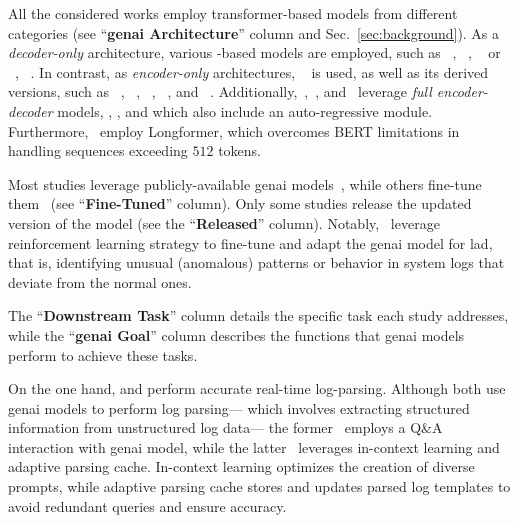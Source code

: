 All the considered works employ transformer-based models from different categories (see ``\textbf{\gls{genai} Architecture}'' column and \cf  Sec.~\ref{sec:background}).
As a \emph{decoder-only} architecture, various -based models are employed, such as 
~\cite{setianto2021gpt,ott2021robust,ji2023log,han2023loggpt,karlsen2024large}, ~\cite{boffa2024logprecis}, ~\cite{pan2023raglog} or ~\cite{jiang2023lilac,mudgal2023assessment,balasubramanian2024cygent}, ~\cite{karlsen2024large}.
In contrast, as \emph{encoder-only} architectures, ~\cite{ott2021robust,boffa2024logprecis,meyuhas2024,voros2023web,tian2024dom} is used, as well as its derived versions, such as
%
~\cite{karlsen2024large, meyuhas2024, almodovar2024logfit}, 
%
~\cite{karlsen2024large}, ~\cite{voros2023web},
~\cite{boffa2024logprecis}, and ~\cite{boffa2024logprecis}.
Additionally,~\citet{balasubramanian2024cygent},~\citet{ott2021robust}, and~\cite{voros2023web} leverage \emph{full encoder-decoder} models, \ie {}, , and  which also include an auto-regressive module.
%
Furthermore,~\citet{almodovar2024logfit} employ Longformer, which overcomes BERT limitations in handling sequences exceeding $512$ tokens.
%

%
Most studies leverage publicly-available \gls{genai} models~\cite{ott2021robust,pan2023raglog,qi2023loggpt,jiang2023lilac,ji2023log,mudgal2023assessment,sun2023design, meyuhas2024}, while others fine-tune them~\cite{setianto2021gpt, han2023loggpt, voros2023web, boffa2024logprecis, balasubramanian2024cygent,karlsen2024large, tian2024dom, almodovar2024logfit}
(see ``\textbf{Fine-Tuned}'' column).
%
Only some studies release the updated version of the model (see the ``\textbf{Released}'' column).
Notably,~\citet{han2023loggpt} leverage reinforcement learning strategy to fine-tune and adapt the \gls{genai} model for \gls{lad},
that is, identifying unusual (\viz anomalous) patterns or behavior in system logs that deviate from the normal ones. 



The ``\textbf{Downstream Task}'' column details the specific task each study addresses, while the ``\textbf{\gls{genai} Goal}'' column describes the functions that \gls{genai} models perform to achieve these tasks.

On the one hand, \citet{setianto2021gpt} and \citet{jiang2023lilac} perform accurate real-time log-parsing.
Although both use \gls{genai} models to perform log parsing---%
which involves extracting structured information from unstructured log data---%
the former~\cite{setianto2021gpt} employs a Q\&A interaction with \gls{genai} model, while the latter~\cite{jiang2023lilac} leverages in-context learning and adaptive parsing cache.
In-context learning optimizes the creation of diverse prompts, while adaptive parsing cache stores and updates parsed log templates to avoid redundant queries and ensure accuracy.


